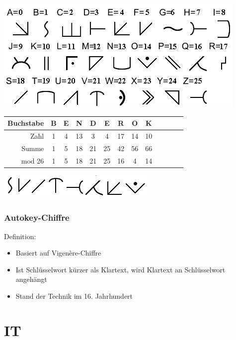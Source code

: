 \begin{frame}
\begin{center}
	\includegraphics[width=.5\textwidth]{autokey_chiffre.png}
\end{center}

\begin{longtable}{|r|c|c|c|c|c|c|c|c|c|c|c|c|}
\hline
Buchstabe & B & E &  N &  D &  E &  R &  O &  K\\\hline
Zahl      & 1 & 4 & 13 &  3 &  4 & 17 & 14 & 10\\\hline
Summe     & 1 & 5 & 18 & 21 & 25 & 42 & 56 & 66\\\hline
mod 26    & 1 & 5 & 18 & 21 & 25 & 16 &  4 & 14\\\hline
\end{longtable}

\begin{center}
	\includegraphics[width=.4\textwidth]{bender_ok.png}
\end{center}

\end{frame}

\begin{frame}
\frametitle{Autokey-Chiffre}
\begin{block}{Definition:}
\begin{itemize}
	\item Basiert auf Vigenère-Chiffre
	\item Ist Schlüsselwort kürzer als Klartext, wird Klartext an Schlüsselwort angehängt
	\item Stand der Technik im 16. Jahrhundert
\end{itemize}
\end{block}
\end{frame}



\section{IT}

